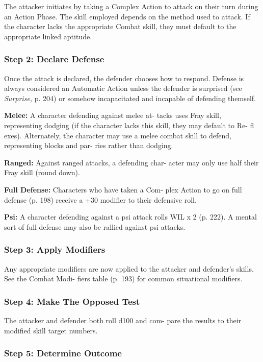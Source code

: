 The attacker initiates by taking a Complex Action to 
attack on their turn during an Action Phase. The skill 
employed depends on the method used to attack. If 
the character lacks the appropriate Combat skill, they 
must default to the appropriate linked aptitude.

\subsubsection{Step 2: Declare Defense}

Once the attack is declared, the defender chooses how 
to respond. Defense is always considered an Automatic 
Action unless the defender is surprised (see \textit{Surprise,}
p. 204) or somehow incapacitated and incapable of 
defending themself.

\textbf{Melee:} A character defending against melee at-
tacks uses Fray skill, representing dodging (if the 
character lacks this skill, they may default to Re-
fl exes). Alternately, the character may use a melee 
combat skill to defend, representing blocks and par-
ries rather than dodging.

\textbf{Ranged: }Against ranged attacks, a defending char-
acter may only use half their Fray skill (round down).

\textbf{Full Defense:} Characters who have taken a Com-
plex Action to go on full defense (p. 198) receive a 
+30 modifier to their defensive roll.

\textbf{Psi: }A character defending against a psi attack rolls 
WIL x 2 (p. 222). A mental sort of full defense may 
also be rallied against psi attacks.

\subsubsection{Step 3: Apply Modifiers}

Any appropriate modifiers are now applied to the 
attacker and defender's skills. See the Combat Modi-
fiers table (p. 193) for common situational modifiers.

\subsubsection{Step 4: Make The Opposed Test}

The attacker and defender both roll d100 and com-
pare the results to their modified skill target numbers.

\subsubsection{Step 5: Determine Outcome}

